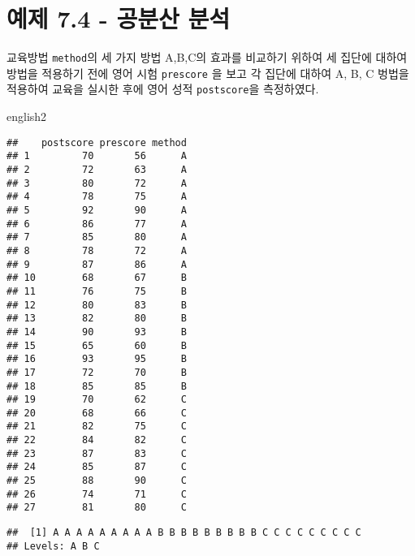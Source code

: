 \documentclass[
]{book}
\newenvironment{Shaded}{\begin{snugshade}}{\end{snugshade}}
\newcommand{\AttributeTok}[1]{\textcolor[rgb]{0.77,0.63,0.00}{#1}}
\newcommand{\FunctionTok}[1]{\textcolor[rgb]{0.00,0.00,0.00}{#1}}
\newcommand{\NormalTok}[1]{#1}
\newcommand{\OtherTok}[1]{\textcolor[rgb]{0.56,0.35,0.01}{#1}}
\newcommand{\SpecialCharTok}[1]{\textcolor[rgb]{0.00,0.00,0.00}{#1}}
\newcommand{\StringTok}[1]{\textcolor[rgb]{0.31,0.60,0.02}{#1}}
\begin{document}
\hypertarget{uxc608uxc81c-7.4---uxacf5uxbd84uxc0b0-uxbd84uxc11d}{%
\section{예제 7.4 - 공분산 분석}\label{uxc608uxc81c-7.4---uxacf5uxbd84uxc0b0-uxbd84uxc11d}}

교육방법 \texttt{method}의 세 가지 방법 A,B,C의 효과를 비교하기 위하여 세 집단에 대하여 방법을 적용하기 전에 영어 시험 \texttt{prescore} 을 보고 각 집단에 대하여 A, B, C 벙법을 적용하여 교육을 실시한 후에 영어 성적 \texttt{postscore}을 측정하였다.

\begin{Shaded}
\begin{Highlighting}[]
\NormalTok{english2}
\end{Highlighting}
\end{Shaded}

\begin{verbatim}
##    postscore prescore method
## 1         70       56      A
## 2         72       63      A
## 3         80       72      A
## 4         78       75      A
## 5         92       90      A
## 6         86       77      A
## 7         85       80      A
## 8         78       72      A
## 9         87       86      A
## 10        68       67      B
## 11        76       75      B
## 12        80       83      B
## 13        82       80      B
## 14        90       93      B
## 15        65       60      B
## 16        93       95      B
## 17        72       70      B
## 18        85       85      B
## 19        70       62      C
## 20        68       66      C
## 21        82       75      C
## 22        84       82      C
## 23        87       83      C
## 24        85       87      C
## 25        88       90      C
## 26        74       71      C
## 27        81       80      C
\end{verbatim}

\begin{Shaded}
\end{Shaded}

\begin{verbatim}
##  [1] A A A A A A A A A B B B B B B B B B C C C C C C C C C
## Levels: A B C
\end{verbatim}

\begin{Shaded}
\end{Shaded}
\end{document}
